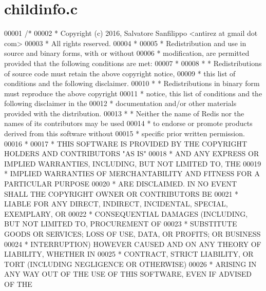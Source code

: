 \hypertarget{childinfo_8c_source}{}\section{childinfo.\+c}
\label{childinfo_8c_source}

\begin{DoxyCode}
00001 \textcolor{comment}{/*}
00002 \textcolor{comment}{ * Copyright (c) 2016, Salvatore Sanfilippo <antirez at gmail dot com>}
00003 \textcolor{comment}{ * All rights reserved.}
00004 \textcolor{comment}{ *}
00005 \textcolor{comment}{ * Redistribution and use in source and binary forms, with or without}
00006 \textcolor{comment}{ * modification, are permitted provided that the following conditions are met:}
00007 \textcolor{comment}{ *}
00008 \textcolor{comment}{ *   * Redistributions of source code must retain the above copyright notice,}
00009 \textcolor{comment}{ *     this list of conditions and the following disclaimer.}
00010 \textcolor{comment}{ *   * Redistributions in binary form must reproduce the above copyright}
00011 \textcolor{comment}{ *     notice, this list of conditions and the following disclaimer in the}
00012 \textcolor{comment}{ *     documentation and/or other materials provided with the distribution.}
00013 \textcolor{comment}{ *   * Neither the name of Redis nor the names of its contributors may be used}
00014 \textcolor{comment}{ *     to endorse or promote products derived from this software without}
00015 \textcolor{comment}{ *     specific prior written permission.}
00016 \textcolor{comment}{ *}
00017 \textcolor{comment}{ * THIS SOFTWARE IS PROVIDED BY THE COPYRIGHT HOLDERS AND CONTRIBUTORS "AS IS"}
00018 \textcolor{comment}{ * AND ANY EXPRESS OR IMPLIED WARRANTIES, INCLUDING, BUT NOT LIMITED TO, THE}
00019 \textcolor{comment}{ * IMPLIED WARRANTIES OF MERCHANTABILITY AND FITNESS FOR A PARTICULAR PURPOSE}
00020 \textcolor{comment}{ * ARE DISCLAIMED. IN NO EVENT SHALL THE COPYRIGHT OWNER OR CONTRIBUTORS BE}
00021 \textcolor{comment}{ * LIABLE FOR ANY DIRECT, INDIRECT, INCIDENTAL, SPECIAL, EXEMPLARY, OR}
00022 \textcolor{comment}{ * CONSEQUENTIAL DAMAGES (INCLUDING, BUT NOT LIMITED TO, PROCUREMENT OF}
00023 \textcolor{comment}{ * SUBSTITUTE GOODS OR SERVICES; LOSS OF USE, DATA, OR PROFITS; OR BUSINESS}
00024 \textcolor{comment}{ * INTERRUPTION) HOWEVER CAUSED AND ON ANY THEORY OF LIABILITY, WHETHER IN}
00025 \textcolor{comment}{ * CONTRACT, STRICT LIABILITY, OR TORT (INCLUDING NEGLIGENCE OR OTHERWISE)}
00026 \textcolor{comment}{ * ARISING IN ANY WAY OUT OF THE USE OF THIS SOFTWARE, EVEN IF ADVISED OF THE}

\end{DoxyCode}
